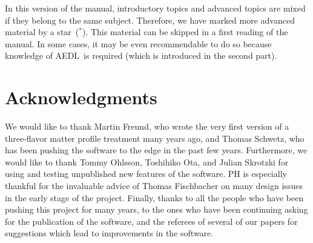 \documentclass[a4paper,12pt,twoside]{book}
\newcommand{\AEDL}{{\sf AEDL}}
\begin{document}
In this version of the manual, introductory topics and advanced topics are
mixed if they belong to the same subject. Therefore, we have marked more
advanced material by a star~($^*$). This material can be skipped in a first
reading of the manual. In some cases, it may be even recommendable to do
so because knowledge of \AEDL\ is required (which is introduced in
the second part).

%
%

\mainmatter







\chapter*{Acknowledgments}

We would like to thank Martin Freund, who wrote the very first
version of a three-flavor matter profile treatment many years ago,
and Thomas Schwetz, who has been pushing the software to the edge in the 
past few years. Furthermore, we would like to thank Tommy Ohlsson,
Toshihiko Ota, and Julian Skrotzki for using and testing unpublished new features of the software.
PH is especially thankful for the invaluable advice of Thomas Fischbacher on
many design issues in the early stage of the project.
Finally, thanks to all the people who have been pushing this project
for many years, to the ones who have been continuing asking for the
publication of the software, and the referees of several of our
papers for suggestions which lead to improvements in the software.
\end{document}
